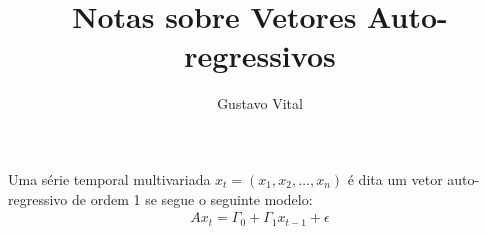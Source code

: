 \documentclass[11pt,a4paper]{article}
\author{Gustavo Vital}
\title{Notas sobre Vetores Auto-regressivos}
\begin{document}
\maketitle

Uma série temporal multivariada $x_t = (x_1, x_2, \dots, x_n)$ é dita um vetor auto-regressivo de ordem 1 se segue o seguinte modelo:
\begin{align}
Ax_t = \Gamma_0 + \Gamma_1 x_{t-1} + \epsilon
\end{align}
\end{document}
